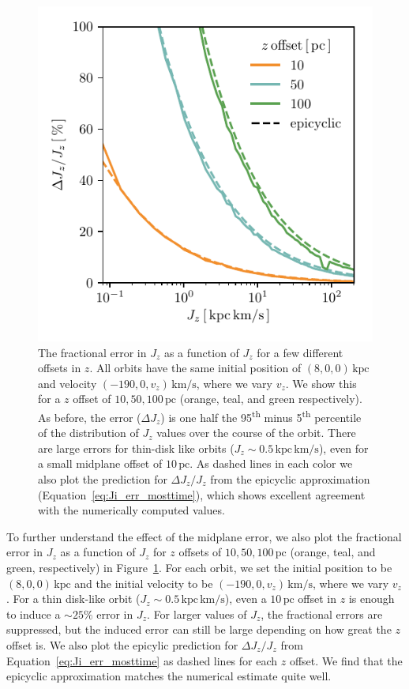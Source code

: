 \documentclass[twocolumn]{aastex62}
\newcommand{\pc}{\text{pc}}
\newcommand{\kpc}{\text{kpc}}
\newcommand{\kms}{\text{km}/\text{s}}
\newcommand{\actunit}{\text{kpc}\,\kms}
\newcommand{\uth}{\textsuperscript{th}}
\begin{document}
\begin{figure}
\begin{center}
\includegraphics[width=\columnwidth]{fig/schmactions_many_orbits_Jz_fun.pdf}
\end{center}
\caption{The fractional error in $J_z$ as a function of $J_z$ for a few
different offsets in $z$. All orbits have the same initial position of $(8, 0,
0)\,\kpc$ and velocity $(-190, 0, v_z)\,\kms$, where we vary $v_z$. We show
this for a $z$ offset of $10, 50, 100\,\pc$ (orange, teal, and green
respectively). As before, the error ($\Delta J_z$) is one half the 95\uth{}
minus 5\uth{} percentile of the distribution of $J_z$ values over the
course of the orbit. There are large errors for thin-disk like orbits ($J_z
\sim 0.5\,\actunit$), even for a small midplane offset of $10\,\pc$. As dashed
lines in each color we also plot the prediction for $\Delta J_z/J_z$ from the
epicyclic approximation (Equation~\eqref{eq:Ji_err_mosttime}), which shows
excellent agreement with the numerically computed values.}
\label{fig:dJz_fun_Jz}
\end{figure}

To further understand the effect of the midplane error, we also plot the
fractional error in $J_z$ as a function of $J_z$ for $z$ offsets of $10, 50,
100\,\pc$ (orange, teal, and green, respectively) in
Figure~\ref{fig:dJz_fun_Jz}. For each orbit, we set the initial position to be
$(8,0,0)\,\kpc$ and the initial velocity to be $(-190, 0, v_z)\,\kms$, where
we vary $v_z$. For a thin disk-like orbit ($J_z\sim0.5\,\actunit$), even a
$10\,\pc$ offset in $z$ is enough to induce a $\sim25\%$ error in $J_z$. For
larger values of $J_z$, the fractional errors are suppressed, but the induced
error can still be large depending on how great the $z$ offset is. We also
plot the epicylic prediction for $\Delta J_z / J_z$ from
Equation~\eqref{eq:Ji_err_mosttime} as dashed lines for each $z$ offset. We
find that the epicyclic approximation matches the numerical estimate quite
well.
\end{document}

